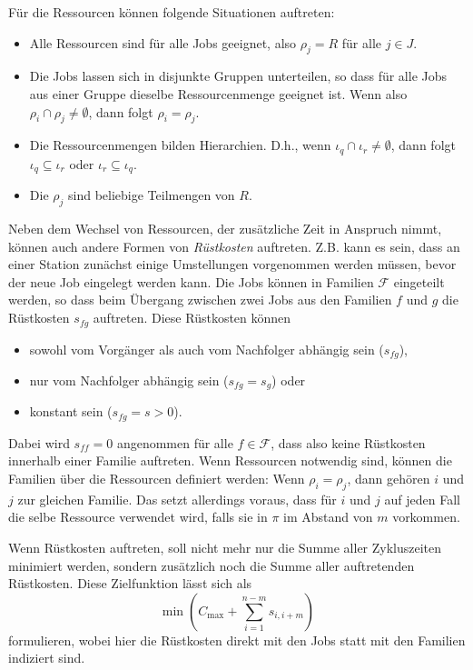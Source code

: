 \documentclass{scrreprt}
\begin{document}
Für die Ressourcen können folgende Situationen auftreten:
\begin{itemize}
    \item Alle Ressourcen sind für alle Jobs geeignet, also $\rho_j=R$ für alle $j\in J$.
    \item Die Jobs lassen sich in disjunkte Gruppen unterteilen, so dass für alle Jobs aus einer Gruppe dieselbe Ressourcenmenge geeignet ist.
        Wenn also $\rho_i \cap \rho_j \neq \emptyset$, dann folgt $\rho_i=\rho_j$.
    \item Die Ressourcenmengen bilden Hierarchien. 
        D.h., wenn $\iota_q \cap \iota_r \neq \emptyset$, dann folgt $\iota_q \subseteq \iota_r$ oder $\iota_r \subseteq \iota_q$.
    \item Die $\rho_j$ sind beliebige Teilmengen von $R$.
\end{itemize}%
Neben dem Wechsel von Ressourcen, der zusätzliche Zeit in Anspruch nimmt, können auch andere Formen von \textit{Rüstkosten}
auftreten. Z.B. kann es sein, dass an einer Station zunächst einige Umstellungen vorgenommen werden müssen, bevor der
neue Job eingelegt werden kann. Die Jobs können in Familien $\mathcal{F}$ eingeteilt werden, so dass beim Übergang
zwischen zwei Jobs aus den Familien $f$ und $g$ die Rüstkosten $s_{fg}$ auftreten.
Diese Rüstkosten können 
\begin{itemize}
    \item sowohl vom Vorgänger als auch vom Nachfolger abhängig sein ($s_{fg}$), 
    \item nur vom Nachfolger abhängig sein ($s_{fg} = s_{g}$) oder
    \item konstant sein ($s_{fg} = s > 0$).
\end{itemize}%
Dabei wird $s_{ff} = 0$ angenommen für alle $f\in\mathcal{F}$, dass also keine Rüstkosten innerhalb einer Familie auftreten.
Wenn Ressourcen notwendig sind, können die Familien über die Ressourcen definiert werden:
Wenn $\rho_i=\rho_j$, dann gehören $i$ und $j$ zur gleichen Familie.
Das setzt allerdings voraus, dass für $i$ und $j$ auf jeden Fall die selbe Ressource verwendet wird, falls sie in $\pi$ im Abstand von $m$ vorkommen.

Wenn Rüstkosten auftreten, soll nicht mehr nur die Summe aller Zykluszeiten minimiert werden, sondern zusätzlich noch die Summe aller auftretenden Rüstkosten.
Diese Zielfunktion lässt sich als 
\[ \min\left(C_{\max}+\sum_{i=1}^{n-m}s_{i,i+m}\right) \] 
formulieren, wobei hier die Rüstkosten direkt mit den Jobs statt mit den Familien indiziert sind.
\end{document}
